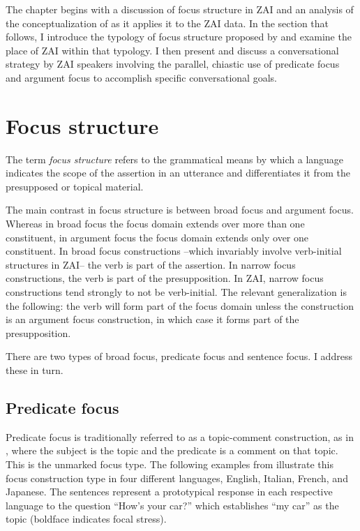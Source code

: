The chapter begins with a discussion of focus structure in ZAI and an analysis of the conceptualization of \citet{lambrecht1994} as it applies it to the ZAI data. In the section that follows, I introduce the typology of focus structure proposed by \citet{vanvalin1999} and examine the place of ZAI within that typology. I then present and discuss a conversational strategy by ZAI speakers involving the parallel, chiastic use of predicate focus and argument focus to accomplish specific conversational goals. 


\section{Focus structure}

The term \textit{focus structure} \citep{lambrecht1994} refers to the grammatical means by which a language indicates the scope of the assertion in an utterance and differentiates it from the presupposed or topical material.

The main contrast in focus structure is between broad focus and argument focus. Whereas in broad focus the focus domain extends over more than one constituent, in argument focus the focus domain extends only over one constituent. In broad focus constructions --which invariably involve verb-initial structures in ZAI-- the verb is part of the assertion. In narrow focus constructions, the verb is part of the presupposition. In ZAI,  narrow focus constructions tend strongly to not be verb-initial. The relevant generalization is the following: the verb will form part of the focus domain unless the construction is an argument focus construction, in which case it forms part of the presupposition.  

There are two types of broad focus, predicate focus and sentence focus. I address these in turn.


\subsection{Predicate focus}\label{pfsection}

Predicate focus is traditionally referred to as a topic-comment construction, as in , where the subject is the topic and the predicate is a comment on that topic. This is the unmarked focus type. The following examples from \citet{lambrecht1994} illustrate this focus construction type in four different languages, English, Italian, French, and Japanese. The sentences represent a prototypical response in each respective language to the question ``How's your car?'' which establishes ``my car'' as the topic (boldface indicates focal stress). 


